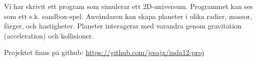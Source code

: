 Vi har skrivit ett program som simulerar ett 2D-universum.
Programmet kan ses som ett s.k. sandbox-spel.
Användaren kan skapa planeter i olika
radier, massor, färger, och hastigheter.
Planeter interagerar med varandra genom gravitation (acceleration)
och kollisioner.

Projektet finns på github:
\url{https://github.com/jesajx/inda12-proj}
